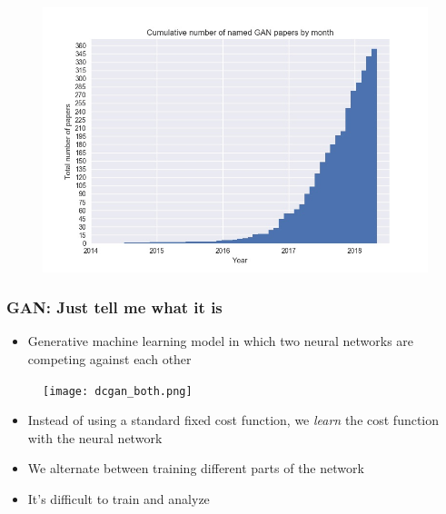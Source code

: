 \documentclass{Bredelebeamer}
\begin{document}

\begin{frame}
\begin{figure}[h!]
	\centering
	\includegraphics[width=\textwidth]{gan_timeline.jpg}
\end{figure}

\end{frame}


\begin{frame}
	\frametitle{GAN: Just tell me what it is}
	\begin{itemize}
		\item Generative machine learning model in which two neural networks are competing against each other
	\end{itemize}
\begin{figure}[h!]
	\centering
	\texttt{[image: dcgan\_both.png]}
\end{figure}
	\pause
	\begin{itemize}[<+->]
		\item Instead of using a standard fixed cost function, we \textit{learn} the cost function with the neural network
		\item We alternate between training different parts of the network
		\item It's difficult to train and analyze
	\end{itemize}
\end{frame}
\end{document}
